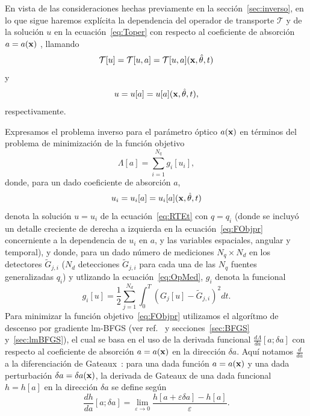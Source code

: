 En vista de las consideraciones hechas previamente en la sección~\ref{sec:inverso}, 
en lo que sigue haremos explícita la dependencia del operador de transporte 
$\mathcal{T}$ y de la solución $u$ en la ecuación~\eqref{eq:Toper} 
con respecto al coeficiente de absorción $a=a(\mathbf{x})$ , llamando 
\begin{equation}\label{eq:Toper_a}
  \mathcal{T}[u] = \mathcal{T}[u,a]= \mathcal{T}[u,a](\mathbf{x},\hat{\theta},t)
\end{equation}
y
\begin{equation}\label{u_of_a}
  u=u[a]=u[a](\mathbf{x},\hat{\theta},t),
\end{equation}
respectivamente.

Expresamos el problema inverso para el parámetro óptico  $a(\mathbf{x})$ 
en términos del problema de minimización de la función objetivo
\begin{equation}
  \Lambda[a]=\sum_{i=1}^{N_q} g_i[u_i],
\label{eq:FObjpr}
\end{equation}
donde, para un dado coeficiente de absorción $a$,
\begin{equation}\label{ui_of_a}
  u_i = u_i[a] = u_i[a](\mathbf{x},\hat{\theta},t)
\end{equation}
denota la solución $u=u_i$ de la ecuación~\eqref{eq:RTEt} con $q=q_i$ 
(donde se incluyó un detalle creciente de derecha a izquierda en la ecuación~\eqref{eq:FObjpr}
concerniente a la dependencia de $u_i$ en $a$, y las variables espaciales, angular y temporal), 
y donde, para un dado número de mediciones $N_q \times N_d$ en los detectores $\tilde{G}_{j,i}$ 
($N_d$ detecciones $\tilde{G}_{j,i}$ para cada una de las $N_q$ fuentes generalizadas $q_i$) 
y utlizando la ecuación~\eqref{eq:OpMed}, $g_i$ denota la funcional 
\begin{equation}
  g_i[u] = \frac{1}{2} \sum_{j=1}^{N_d} \int_0^T (G_j[u]-\tilde
  {G}_{j,i})^2 dt.
\label{eq:FObj}
\end{equation}
Para minimizar la función objetivo~\eqref{eq:FObjpr} utilizamos el algorítmo 
de descenso por gradiente 
lm-BFGS (ver ref.~\cite{Byrd1995} y secciones~\ref{sec:BFGS} y~\ref{sec:lmBFGS}), 
el cual se basa en el uso de la derivada funcional $\frac{d\Lambda}{da} [a;\delta a]$ 
con respecto al coeficiente de absorción $a = a(\mathbf{x})$ en la dirección $\delta a$. 
Aquí notamos $\frac{d}{da}$ a la diferenciación de Gateaux~\cite{Hille1974}: 
para una dada función $a= a(\mathbf{x})$ y una dada perturbación $\delta a= \delta a(\mathbf{x})$, 
la derivada de Gateaux de una dada funcional $h = h[a]$ en la dirección $\delta a$ 
se define según
\begin{equation}\label{gateaux}
  \frac{dh}{da}[a; \delta a ] = \lim_{\varepsilon \to 0} \frac{h[a +\varepsilon \delta a]
    - h[a]}{\varepsilon}.
\end{equation}
